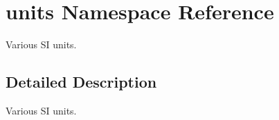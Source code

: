 \hypertarget{namespaceunits}{}\section{units Namespace Reference}
\label{namespaceunits}


Various SI units.  




\subsection{Detailed Description}
Various SI units. 